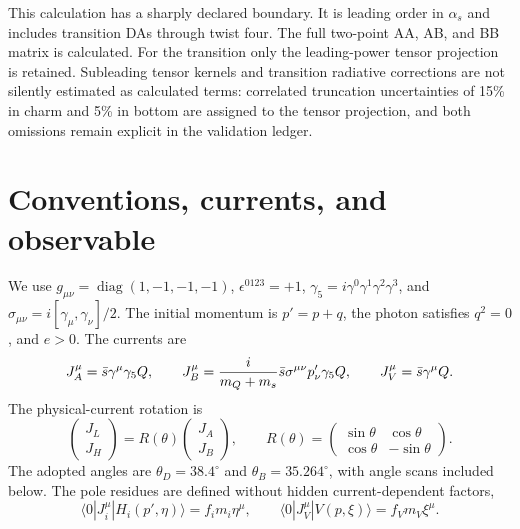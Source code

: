 \documentclass[11pt,a4paper]{article}
\newcommand{\JA}{J_A}
\newcommand{\JB}{J_B}
\newcommand{\JL}{J_L}
\newcommand{\JH}{J_H}
\begin{document}
This calculation has a sharply declared boundary.  It is leading order in
$\alpha_s$ and includes transition DAs through twist four.  The full
two-point AA, AB, and BB matrix is calculated.  For the transition only the
leading-power tensor projection is retained.  Subleading tensor kernels and
transition radiative corrections are not silently estimated as calculated
terms: correlated truncation uncertainties of 15\% in charm and 5\% in bottom
are assigned to the tensor projection, and both omissions remain explicit in
the validation ledger.

\section{Conventions, currents, and observable}

We use $g_{\mu\nu}=\operatorname{diag}(1,-1,-1,-1)$,
$\epsilon^{0123}=+1$, $\gamma_5=i\gamma^0\gamma^1\gamma^2\gamma^3$, and
$\sigma_{\mu\nu}=i[\gamma_\mu,\gamma_\nu]/2$.  The initial momentum is
$p'=p+q$, the photon satisfies $q^2=0$, and $e>0$.  The currents are
\begin{equation}
 \JA^\mu=\bar s\gamma^\mu\gamma_5Q,\qquad
 \JB^\mu={i\over m_Q+m_s}\bar s\sigma^{\mu\nu}p'_\nu\gamma_5Q,\qquad
 J_V^\mu=\bar s\gamma^\mu Q .
\end{equation}
The physical-current rotation is
\begin{equation}
\begin{pmatrix}\JL\\ \JH\end{pmatrix}
=R(\theta)\begin{pmatrix}\JA\\ \JB\end{pmatrix},\qquad
R(\theta)=
\begin{pmatrix}\sin\theta&\cos\theta\\
\cos\theta&-\sin\theta\end{pmatrix}.
\label{eq:rotation}
\end{equation}
The adopted angles are $\theta_D=38.4^\circ$ and
$\theta_B=35.264^\circ$, with angle scans included below.  The pole residues
are defined without hidden current-dependent factors,
\begin{equation}
\langle0|J_i^\mu|H_i(p',\eta)\rangle=f_i m_i\eta^\mu,\qquad
\langle0|J_V^\mu|V(p,\xi)\rangle=f_Vm_V\xi^\mu.
\end{equation}
\end{document}
